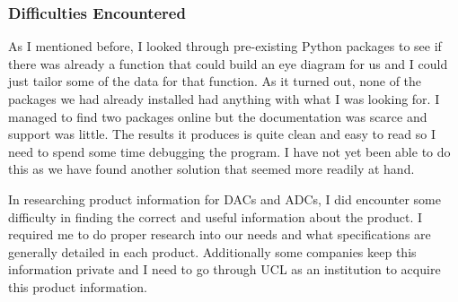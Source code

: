 \subsubsection{Difficulties Encountered}
As I mentioned before, I looked through pre-existing Python packages to see if there was already a function that could build an eye diagram for us and I could just tailor some of the data for that function. As it turned out, none of the packages we had already installed had anything with what I was looking for. I managed to find two packages online but the documentation was scarce and support was little. The results it produces is quite clean and easy to read so I need to spend some time debugging the program. I have not yet been able to do this as we have found another solution that seemed more readily at hand.\newline

In researching product information for DACs and ADCs, I did encounter some difficulty in finding the correct and useful information about the product. I required me to do proper research into our needs and what specifications are generally detailed in each product. Additionally some companies keep this information private and I need to go through UCL as an institution to acquire this product information.